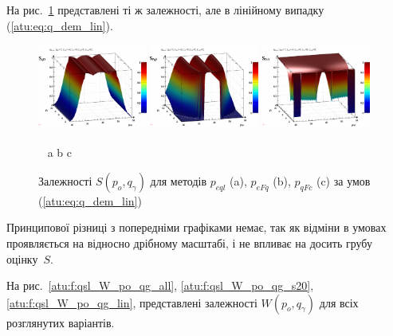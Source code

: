 На рис.~\ref{atu:f:qsl_S_po_qg_lin} представлені ті ж залежності,
але в лінійному випадку (\ref{atu:eq:q_dem_lin}).

\begin{figure}[htb!]
  \begin{center}
    \includegraphics[width=0.32\textwidth]{p/qls_pe-p_po_qg_Sql_lin.png}
    \hfill
    \includegraphics[width=0.32\textwidth]{p/qls_pe-p_po_qg_SFq_lin.png}
    \hfill
    \includegraphics[width=0.32\textwidth]{p/qls_pe-p_po_qg_SFc_lin.png}
  \end{center}
  \vspace{-1.0ex}
  \begin{center}
    ~ \hfill a \hfill\hfill b \hfill\hfill c \hfill ~
  \end{center}
  \vspace{-1.5ex}
  \caption{Залежності $S(p_o,q_\gamma)$ для методів $p_{eql}$ (a), $p_{eFq}$ (b), $p_{qFc}$ (c) за умов (\ref{atu:eq:q_dem_lin})}
  \label{atu:f:qsl_S_po_qg_lin}
\end{figure}

Принципової різниці з попередніми графіками немає, так як відміни в
умовах проявляється на відносно дрібному масштабі, і не впливає
на досить грубу оцінку~$S$.

На рис.~\ref{atu:f:qsl_W_po_qg_all}, \ref{atu:f:qsl_W_po_qg_s20}, \ref{atu:f:qsl_W_po_qg_lin},
представлені залежності
$ W (p_o, q_\gamma) $ для всіх розглянутих варіантів.

